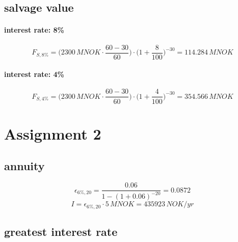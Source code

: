 \documentclass{article}
\begin{document}
\subsection{salvage value}
\paragraph{interest rate: 8\%\\}
$$F_{S,8\%}=\bigg(2300\,MNOK\cdot\frac{60-30}{60}\bigg)\cdot\bigg(1+\frac{8}{100}\bigg)^{-30}=114.284\,MNOK$$
\paragraph{interest rate: 4\%\\}
$$F_{S,4\%}=\bigg(2300\,MNOK\cdot\frac{60-30}{60}\bigg)\cdot\bigg(1+\frac{4}{100}\bigg)^{-30}=354.566\,MNOK$$
\section{Assignment 2}
\subsection{annuity}
$$\epsilon_{6\%,20}=\frac{0.06}{1-(1+0.06)^{-20}}=0.0872$$
$$I=\epsilon_{6\%,20}\cdot 5\,MNOK=435923\,NOK/yr$$
\subsection{greatest interest rate}
\end{document}
